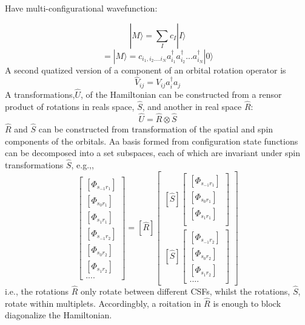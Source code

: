 \documentclass[12pt]{article}
\begin{document}
Have multi-configurational wavefunction:

\begin{equation}
|M\rangle = \sum_{I} c_{I} |I\rangle
\end{equation}
\begin{equation}
= |M\rangle = c_{i_{1},i_{2}....i_{N}} a^{\dagger}_{i_{1}}a^{\dagger}_{i_{2}}...a^{\dagger}_{i_{N}}  |0\rangle
\end{equation}
\noindent  A second quatized version of a component of an orbital rotation operator is
\begin{equation}
\hat{V}_{ij}  = V_{ij}a^{\dagger}_{i}a_{j}
\end{equation}
A transformations,$\hat{U}$, of the Hamiltonian can be constructed from a rensor product of rotations in reals space, $\hat{S}$, and another in real space $\hat{R}$:
\begin{equation}
\hat{U} = \hat{R}\otimes\hat{S} 
\end{equation}
\noindent  $\hat{R}$ and $\hat{S}$ can be constructed from transformation of the spatial and spin components of the orbitals.
Aa basis formed from configuration state functions can be decomposed into a set subspaces, each of which are invariant under spin transformations $\hat{S}$, e.g.,,
\begin{equation}
[\hat{U}]
\begin{bmatrix}
[\Phi_{s_{-1}r_{1}}]\\
[\Phi_{s_{0}r_{1}}]\\
[\Phi_{s_{1}r_{1}}]\\
[\Phi_{s_{-1}r_{2}}]\\
[\Phi_{s_{0}r_{2}}]\\
[\Phi_{s_{1}r_{2}}]\\
...         .
\end{bmatrix}
=
[\hat{R}]
\begin{bmatrix}
[\hat{S}]
\begin{bmatrix}
[\Phi_{s_{-1}r_{1}}]\\
[\Phi_{s_{0}r_{1}}]\\
[\Phi_{s_{1}r_{1}}]\\
\end{bmatrix}
\\
[\hat{S}]
\begin{bmatrix}
[\Phi_{s_{-1}r_{2}}]\\
[\Phi_{s_{0}r_{2}}]\\
[\Phi_{s_{1}r_{2}}]\\
...         .
\end{bmatrix}
\end{bmatrix}
\end{equation}
\noindent i.e., the rotations $\hat{R}$ only rotate between different CSFs, whilst the rotations, $\hat{S}$,  rotate within multiplets.
Accordingbly, a roitation in $\hat{R}$ is enough to block diagonalize the Hamiltonian. 
\end{document}
